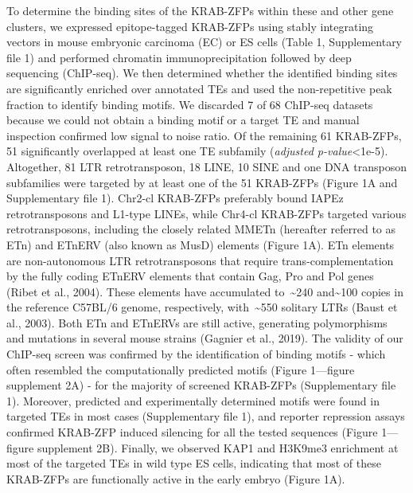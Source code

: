 \documentclass[11pt,a4paper]{article}
\begin{document}
To determine the binding sites of the KRAB-ZFPs within these and other gene clusters, we expressed epitope-tagged KRAB-ZFPs using stably integrating vectors in mouse embryonic carcinoma (EC) or ES cells (Table 1, Supplementary file 1) and performed chromatin immunoprecipitation followed by deep sequencing (ChIP-seq). We then determined whether the identified binding sites are significantly enriched over annotated TEs and used the non-repetitive peak fraction to identify binding motifs. We discarded 7 of 68 ChIP-seq datasets because we could not obtain a binding motif or a target TE and manual inspection confirmed low signal to noise ratio. Of the remaining 61 KRAB-ZFPs, 51 significantly overlapped at least one TE subfamily (\textit{adjusted p-value}<1e-5). Altogether, 81 LTR retrotransposon, 18 LINE, 10 SINE and one DNA transposon subfamilies were targeted by at least one of the 51 KRAB-ZFPs (Figure 1A and Supplementary file 1). Chr2-cl KRAB-ZFPs preferably bound IAPEz retrotransposons and L1-type LINEs, while Chr4-cl KRAB-ZFPs targeted various retrotransposons, including the closely related MMETn (hereafter referred to as ETn) and ETnERV (also known as MusD) elements (Figure 1A). ETn elements are non-autonomous LTR retrotransposons that require trans-complementation by the fully coding ETnERV elements that contain Gag, Pro and Pol genes (Ribet et al., 2004). These elements have accumulated to \textasciitilde{}240 and\textasciitilde{}100 copies in the reference C57BL/6 genome, respectively, with \textasciitilde{}550 solitary LTRs (Baust et al., 2003). Both ETn and ETnERVs are still active, generating polymorphisms and mutations in several mouse strains (Gagnier et al., 2019). The validity of our ChIP-seq screen was confirmed by the identification of binding motifs - which often resembled the computationally predicted motifs (Figure 1—figure supplement 2A) - for the majority of screened KRAB-ZFPs (Supplementary file 1). Moreover, predicted and experimentally determined motifs were found in targeted TEs in most cases (Supplementary file 1), and reporter repression assays confirmed KRAB-ZFP induced silencing for all the tested sequences (Figure 1—figure supplement 2B). Finally, we observed KAP1 and H3K9me3 enrichment at most of the targeted TEs in wild type ES cells, indicating that most of these KRAB-ZFPs are functionally active in the early embryo (Figure 1A).
\end{document}
